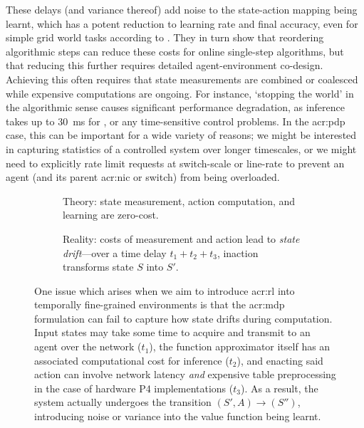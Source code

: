 These delays (and variance thereof) add noise to the state-action mapping being learnt, which has a potent reduction to learning rate and final accuracy, even for simple grid world tasks according to \textcite{DBLP:journals/firai/TravnikMSP18}.
They in turn show that reordering algorithmic steps can reduce these costs for online single-step algorithms, but that reducing this further requires detailed agent-environment co-design.
Achieving this often requires that state measurements are combined or coalesced~\parencite{DBLP:journals/corr/abs-1910-04054,DBLP:journals/tnsm/SimpsonRP20} while expensive computations are ongoing.
For instance, `stopping the world' in the algorithmic sense causes significant performance degradation, as inference takes up to \SI{30}{\milli\second} for \citeauthor{DBLP:journals/corr/abs-1910-04054}, or any time-sensitive control problems.
In the \gls{acr:pdp} case, this can be important for a wide variety of reasons; we might be interested in capturing statistics of a controlled system over longer timescales, or we might need to explicitly rate limit requests at switch-scale or line-rate to prevent an agent (and its parent \gls{acr:nic} or switch) from being overloaded.

\begin{figure}
	\begin{subfigure}{0.45\linewidth}
		\centering
		\resizebox{0.975\linewidth}{!}{}
		\caption{Theory: state measurement, action computation, and learning are zero-cost.}
	\end{subfigure}
	\hspace{0.05\linewidth}
	\begin{subfigure}{0.45\linewidth}
		\centering
		\resizebox{0.75\linewidth}{!}{}
		\caption{Reality: costs of measurement and action lead to \emph{state drift}---over a time delay $t_1+t_2+t_3$, inaction transforms state $S$ into $S'$.}
	\end{subfigure}
	\caption[Illustrating state slippage in an asynchronous RL agent.]{One issue which arises when we aim to introduce \gls{acr:rl} into temporally fine-grained environments is that the \gls{acr:mdp} formulation can fail to capture how state drifts during computation. Input states may take some time to acquire and transmit to an agent over the network ($t_1$), the function approximator itself has an associated computational cost for inference ($t_2$), and enacting said action can involve network latency \emph{and} expensive table preprocessing in the case of hardware P4 implementations ($t_3$). As a result, the system actually undergoes the transition $(S', A)\rightarrow(S'')$, introducing noise or variance into the value function being learnt. \label{fig:state-slip}}
\end{figure}

